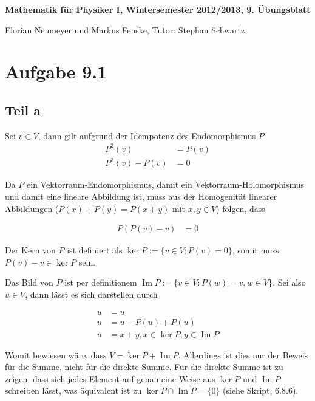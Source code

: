 \documentclass[a4paper,german,12pt,smallheadings]{scrartcl}
\begin{document}
\begin{center}
\bfseries %
\sffamily %
\vspace{-40pt}
Mathematik für Physiker I, Wintersemester 2012/2013, 9. Übungsblatt

Florian Neumeyer und Markus Fenske, Tutor: Stephan Schwartz
\vspace{-10pt}
\end{center}


\section*{Aufgabe 9.1}
\subsection*{Teil a}

Sei $v \in V$, dann gilt aufgrund der Idempotenz des Endomorphismus $P$
\begin{align*}
  P^2(v) &= P(v) \\
  P^2(v) - P(v) &= 0
\end{align*}

Da $P$ ein Vektorraum-Endomorphismus, damit ein Vektorraum-Holomorphismus und
damit eine lineare Abbildung ist, muss aus der Homogenität linearer
Abbildungen ($P(x) + P(y) = P(x+y)$ mit $x{,}y \in V$) folgen, dass

\begin{align*}
  P(P(v) - v) &= 0
\end{align*}

Der Kern von $P$ ist definiert als $\ker P := \{v \in V: P(v) = 0\}$, somit
muss $P(v) - v \in \ker P$ sein.

Das Bild von $P$ ist per definitionem $\operatorname{Im} P := \{v \in V: P(w) = v, w \in V\}$.
Sei also $u \in V$, dann lässt es sich darstellen durch

\begin{align*}
  u &= u \\
  u &= u - P(u) + P(u) \\
  u &= x + y, x \in \ker P, y \in \operatorname{Im} P
\end{align*}

Womit bewiesen wäre, dass $V = \ker P + \operatorname{Im} P$. Allerdings ist
dies nur der Beweis für die Summe, nicht für die direkte Summe. Für die direkte
Summe ist zu zeigen, dass sich jedes Element auf genau eine Weise aus $\ker P$
und $\operatorname{Im} P$ schreiben lässt, was äquivalent ist zu $\ker P \cap
\operatorname{Im} P = \{0\}$ (siehe Skript, 6.8.6).
\end{document}
